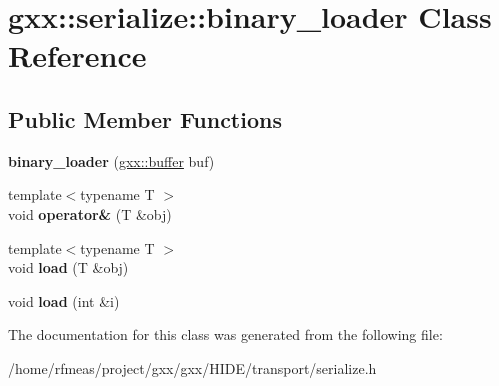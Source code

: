 \hypertarget{classgxx_1_1serialize_1_1binary__loader}{}\section{gxx\+:\+:serialize\+:\+:binary\+\_\+loader Class Reference}
\label{classgxx_1_1serialize_1_1binary__loader}
\subsection*{Public Member Functions}
\begin{DoxyCompactItemize}
\item 
{\bfseries binary\+\_\+loader} (\hyperlink{classgxx_1_1buffer}{gxx\+::buffer} buf)\hypertarget{classgxx_1_1serialize_1_1binary__loader_ab2f5fe7dae09fbd8bcff38d3bcf316ac}{}\label{classgxx_1_1serialize_1_1binary__loader_ab2f5fe7dae09fbd8bcff38d3bcf316ac}

\item 
{\footnotesize template$<$typename T $>$ }\\void {\bfseries operator\&} (T \&obj)\hypertarget{classgxx_1_1serialize_1_1binary__loader_ae5cbcff20c75f9278b3fa402764be1a2}{}\label{classgxx_1_1serialize_1_1binary__loader_ae5cbcff20c75f9278b3fa402764be1a2}

\item 
{\footnotesize template$<$typename T $>$ }\\void {\bfseries load} (T \&obj)\hypertarget{classgxx_1_1serialize_1_1binary__loader_a69bc4b2cb1bd677470b4f9dbe929f265}{}\label{classgxx_1_1serialize_1_1binary__loader_a69bc4b2cb1bd677470b4f9dbe929f265}

\item 
void {\bfseries load} (int \&i)\hypertarget{classgxx_1_1serialize_1_1binary__loader_aadffa2611b810a4040d0917252c9b5ee}{}\label{classgxx_1_1serialize_1_1binary__loader_aadffa2611b810a4040d0917252c9b5ee}

\end{DoxyCompactItemize}


The documentation for this class was generated from the following file\+:\begin{DoxyCompactItemize}
\item 
/home/rfmeas/project/gxx/gxx/\+H\+I\+D\+E/transport/serialize.\+h\end{DoxyCompactItemize}
